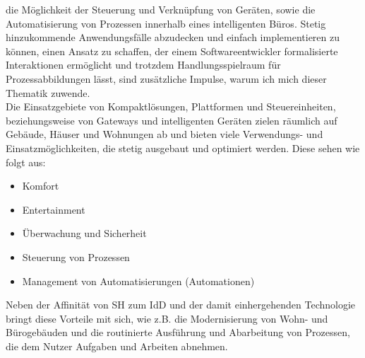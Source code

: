     die Möglichkeit der Steuerung und Verknüpfung von Geräten, sowie die Automatisierung von Prozessen innerhalb eines intelligenten Büros. 
    Stetig hinzukommende Anwendungsfälle abzudecken und einfach implementieren zu können, einen Ansatz zu schaffen, der einem 
    Softwareentwickler formalisierte Interaktionen ermöglicht und trotzdem Handlungsspielraum für Prozessabbildungen lässt, sind 
    zusätzliche Impulse, warum ich mich dieser Thematik zuwende. 
    \\ 
    \linebreak
    Die Einsatzgebiete von Kompaktlösungen, Plattformen und Steuereinheiten, beziehungsweise von Gateways und intelligenten Geräten zielen räumlich 
    auf Gebäude, Häuser und Wohnungen ab und bieten viele Verwendungs- und Einsatzmöglichkeiten, die stetig ausgebaut und optimiert werden. 
    Diese sehen wie folgt aus: 
    \begin{itemize}
        \item Komfort
        \item Entertainment
        \item Überwachung und Sicherheit
        \item Steuerung von Prozessen
        \item Management von Automatisierungen (Automationen)
    \end{itemize}    
    Neben der Affinität von \acl{SH} zum \acl{IdD} und der damit einhergehenden Technologie bringt diese Vorteile mit sich, wie z.B. 
    die Modernisierung von Wohn- und Bürogebäuden und die routinierte Ausführung und Abarbeitung von Prozessen, die dem Nutzer 
    Aufgaben und Arbeiten abnehmen.
\pagebreak

